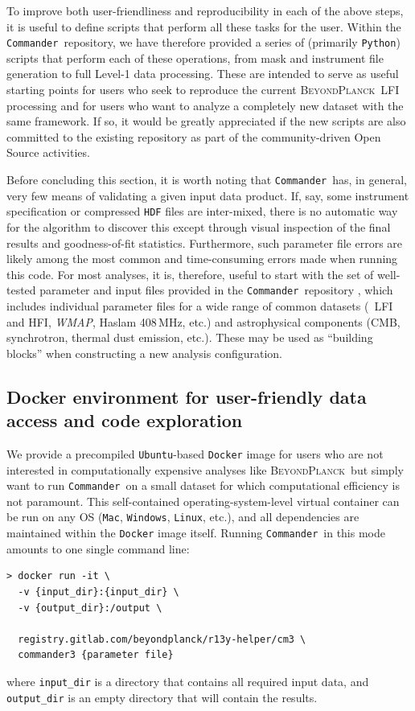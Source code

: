 \documentclass[twocolumn]{openjournal}
\def\WMAP{\textit{WMAP}}
\def\commander{\texttt{Commander}}
\newcommand{\BP}{\textsc{BeyondPlanck}}
\begin{document}
To improve both user-friendliness and reproducibility in each of the above
steps, it is useful to define scripts that perform all these tasks for the
user. Within the \commander\ repository, we have therefore provided a series of
(primarily \texttt{Python}) scripts that perform each of these operations, from
mask and instrument file generation to full Level-1 data processing. These are
intended to serve as useful starting points for users who seek to reproduce the
current \BP\ LFI processing and for users who want to analyze a completely new
dataset with the same framework. If so, it would be greatly appreciated if the
new scripts are also committed to the existing repository as part of the
community-driven Open Source activities.

Before concluding this section, it is worth noting that \commander\ has, in
general, very few means of validating a given input data product. If, say, some
instrument specification or compressed \texttt{HDF} files are inter-mixed,
there is no automatic way for the algorithm to discover this except through
visual inspection of the final results and goodness-of-fit statistics.
Furthermore, such parameter file errors are likely among the most common and
time-consuming errors made when running this code. For most analyses, it is,
therefore, useful to start with the set of well-tested parameter and input
files provided in the \commander\ repository \citep{bp03}, which includes
individual parameter files for a wide range of common datasets (\Planck\ LFI
and HFI, \WMAP, Haslam 408\,MHz, etc.) and astrophysical components (CMB,
synchrotron, thermal dust emission, etc.). These may be used as ``building
blocks'' when constructing a new analysis configuration.


\subsection{Docker environment for user-friendly data access and code exploration}

We provide a precompiled \texttt{Ubuntu}-based \texttt{Docker} image for users
who are not interested in computationally expensive analyses like \BP\ but
simply want to run \commander\ on a small dataset for which computational
efficiency is not paramount. This self-contained operating-system-level virtual
container can be run on any OS (\texttt{Mac}, \texttt{Windows}, \texttt{Linux},
etc.), and all dependencies are maintained within the \texttt{Docker} image
itself. Running \commander\ in this mode amounts to one single command line:
{\small
\begin{verbatim}
> docker run -it \
  -v {input_dir}:{input_dir} \
  -v {output_dir}:/output \

  registry.gitlab.com/beyondplanck/r13y-helper/cm3 \
  commander3 {parameter file}
\end{verbatim}
}
\noindent where \texttt{input\_dir} is a directory that contains all required
input data, and \texttt{output\_dir} is an empty directory that will
contain the results. 
\end{document}
